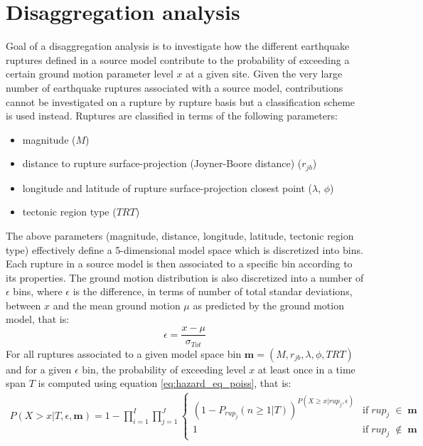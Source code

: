 \section{Disaggregation analysis}
Goal of a disaggregation analysis is to investigate how the different earthquake ruptures defined in a source model
contribute to the probability of exceeding a certain ground motion parameter level $x$ at a given site. Given the very large number
of earthquake ruptures associated with a source model, contributions cannot be investigated on a rupture by
rupture basis but a classification scheme is used instead. Ruptures are classified in terms of the following parameters:
\begin{itemize}
	\item magnitude ($M$)
	\item distance to rupture surface-projection (Joyner-Boore distance) ($r_{jb}$)
	\item longitude and latitude of rupture surface-projection closest point ($\lambda$, $\phi$)
	\item tectonic region type ($TRT$)
\end{itemize}
The above parameters (magnitude, distance, longitude, latitude, tectonic region type) effectively define a 5-dimensional
model space which is discretized into bins. Each rupture in a source model is then associated to a specific bin
according to its properties. The ground motion distribution is also discretized into a number of $\epsilon$ bins,
where $\epsilon$ is the difference, in terms of number of total standar deviations, between $x$ and the mean ground
motion $\mu$ as predicted by the ground motion model, that is:
\begin{equation}
\epsilon = \frac{x - \mu}{\sigma_{Tot}}
\end{equation}
For all ruptures associated to a given model space bin $\bm{m} = (M, r_{jb}, \lambda, \phi, TRT)$
and for a given $\epsilon$ bin, the probability of exceeding level $x$ at least once in a time span $T$ is computed using equation
\ref{eq:hazard_eq_poiss}, that is:
\begin{align}
\label{eq:disagg}
P(X > x | T, \epsilon, \bm{m}) =
	1 - \prod_{i=1}^{I}\prod_{j=1}^{J}
	\begin{cases} (1 - P_{rup_{j}}(n \ge 1 | T))^{P(X \ge x | rup_{j}, \epsilon)} & \mbox{if}\;rup_{j}\;\in\;\bm{m}\\
			      1 & \mbox{if}\;rup_{j}\;\notin\;\bm{m}
	\end{cases}
\end{align}

